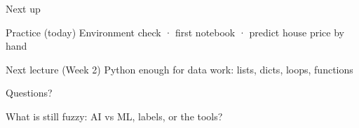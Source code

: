 \documentclass[aspectratio=169,11pt]{beamer}
\begin{document}
    \begin{frame}{Next up}
        \begin{block}{Practice (today)}
            Environment check · first notebook · predict house price by hand
        \end{block}
        \vspace{0.5em}
        \begin{block}{Next lecture (Week 2)}
            Python enough for data work: lists, dicts, loops, functions
        \end{block}
    \end{frame}

    \begin{frame}{Questions?}
        \begin{center}
            {\Large What is still fuzzy: AI vs ML, labels, or the tools?}
        \end{center}
    \end{frame}
\end{document}
